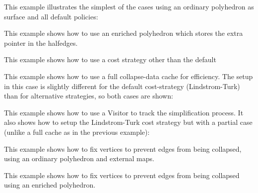 This example illustrates the simplest of the cases using an ordinary polyhedron as surface and all default policies:

This example shows how to use an enriched polyhedron which stores the extra pointer in the halfedges.

This example shows how to use a cost strategy other than the default

This example shows how to use a full collapse-data cache for efficiency. The setup in this case is slightly different for the default cost-strategy (Lindstrom-Turk) than for alternative strategies, so both cases are shown:

This example shows how to use a Visitor to track the simplification process. It also shows how to setup the Lindstrom-Turk cost strategy but with a partial case (unlike a full cache as in the previous example):

This example shows how to fix vertices to prevent edges from being collapsed, using an ordinary polyhedron and external maps.

This example shows how to fix vertices to prevent edges from being collapsed using an enriched polyhedron.



